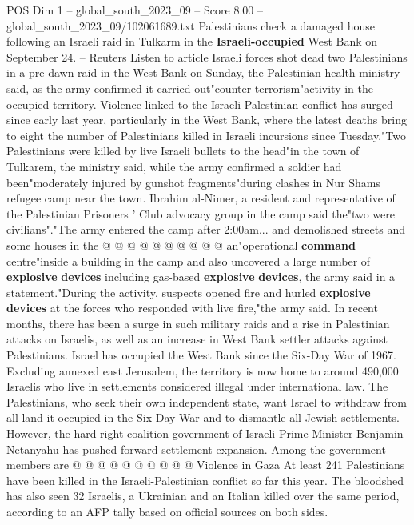 \begin{textsample}{POS Dim 1 – global\_south\_2023\_09 – Score 8.00 – global\_south\_2023\_09/102061689.txt}  \label{ex:f1_pos_431}
Palestinians check a damaged house following an Israeli raid in Tulkarm in the \textbf{Israeli-occupied} West Bank on September 24. -- Reuters Listen to article Israeli forces shot dead two Palestinians in a pre-dawn raid in the West Bank on Sunday, the Palestinian health ministry said, as the army confirmed it carried out"counter-terrorism"activity in the occupied territory.
Violence linked to the Israeli-Palestinian conflict has surged since early last year, particularly in the West Bank, where the latest deaths bring to eight the number of Palestinians killed in Israeli incursions since Tuesday."Two Palestinians were killed by live Israeli bullets to the head"in the town of Tulkarem, the ministry said, while the army confirmed a soldier had been"moderately injured by gunshot fragments"during clashes in Nur Shams refugee camp near the town.
Ibrahim al-Nimer, a resident and representative of the Palestinian Prisoners ' Club advocacy group in the camp said the"two were civilians"."The army entered the camp after 2:00am... and demolished streets and some houses in the @ @ @ @ @ @ @ @ @ @ an"operational \textbf{command} centre"inside a building in the camp and also uncovered a large number of \textbf{explosive} \textbf{devices} including gas-based \textbf{explosive} \textbf{devices}, the army said in a statement."During the activity, suspects opened fire and hurled \textbf{explosive} \textbf{devices} at the forces who responded with live fire,"the army said.
In recent months, there has been a surge in such military raids and a rise in Palestinian attacks on Israelis, as well as an increase in West Bank settler attacks against Palestinians.
Israel has occupied the West Bank since the Six-Day War of 1967.
Excluding annexed east Jerusalem, the territory is now home to around 490,000 Israelis who live in settlements considered illegal under international law.
The Palestinians, who seek their own independent state, want Israel to withdraw from all land it occupied in the Six-Day War and to dismantle all Jewish settlements.
However, the hard-right coalition government of Israeli Prime Minister Benjamin Netanyahu has pushed forward settlement expansion.
Among the government members are @ @ @ @ @ @ @ @ @ @ Violence in Gaza At least 241 Palestinians have been killed in the Israeli-Palestinian conflict so far this year.
The bloodshed has also seen 32 Israelis, a Ukrainian and an Italian killed over the same period, according to an AFP tally based on official sources on both sides.

\end{textsample}
